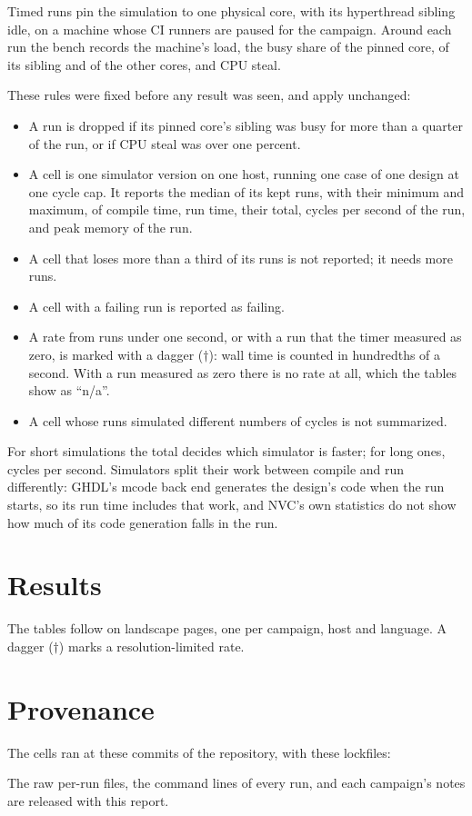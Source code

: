 \documentclass[11pt]{article}
\begin{document}
Timed runs pin the simulation to one physical core, with its
hyperthread sibling idle, on a machine whose CI runners are paused for the
campaign. Around each run the bench records the machine's load, the busy
share of the pinned core, of its sibling and of the other cores, and CPU
steal.

These rules were fixed before any result was seen, and apply unchanged:
\begin{itemize}
\item A run is dropped if its pinned core's sibling was busy for more than
a quarter of the run, or if CPU steal was over one percent.
\item A cell is one simulator version on one host, running one case of
one design at one cycle cap. It reports the median of its kept runs, with
their minimum and maximum, of compile time, run time, their total, cycles
per second of the run, and peak memory of the run.
\item A cell that loses more than a third of its runs is not reported; it
needs more runs.
\item A cell with a failing run is reported as failing.
\item A rate from runs under one second, or with a run that the timer
measured as zero, is marked with a dagger ($\dagger$): wall time is
counted in hundredths of a second. With a run measured as zero there is
no rate at all, which the tables show as ``n/a''.
\item A cell whose runs simulated different numbers of cycles is not
summarized.
\end{itemize}
For short simulations the total decides which simulator is faster; for
long ones, cycles per second. Simulators split their work between compile
and run differently: GHDL's mcode back end generates the design's code
when the run starts, so its run time includes that work, and NVC's own
statistics do not show how much of its code generation falls in the run.

\section{Results}

The tables follow on landscape pages, one per campaign, host and
language. A dagger ($\dagger$) marks a resolution-limited rate.

\begin{landscape}

\end{landscape}

\section{Provenance}

The cells ran at these commits of the repository, with these lockfiles:



The raw per-run files, the command lines of every run, and each
campaign's notes are released with this report.
\end{document}

